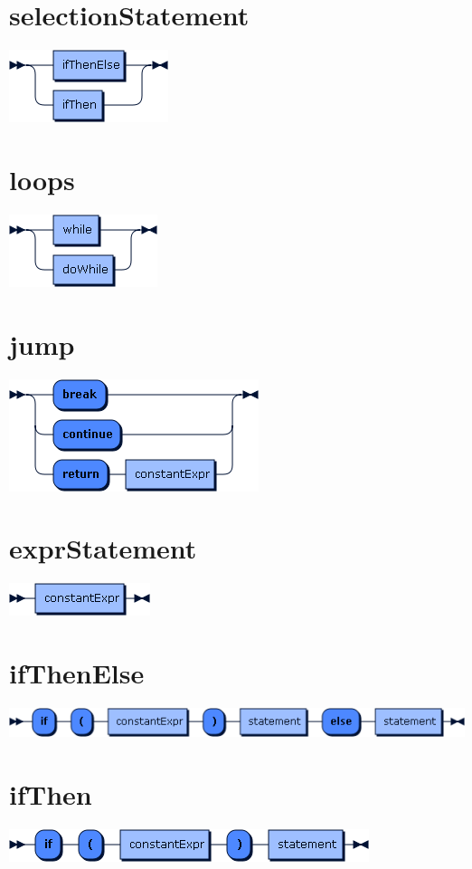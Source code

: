 \begin{appendices}
\section*{selectionStatement}\includegraphics[scale=0.7]{img/ebnf_grammar/selectionStatement}
\section*{loops}\includegraphics[scale=0.7]{img/ebnf_grammar/loops}
\section*{jump}\includegraphics[scale=0.7]{img/ebnf_grammar/jump}
\section*{exprStatement}\includegraphics[scale=0.7]{img/ebnf_grammar/exprStatement}

\section*{ifThenElse}\includegraphics[scale=0.7]{img/ebnf_grammar/ifThenElse}
\section*{ifThen}\includegraphics[scale=0.7]{img/ebnf_grammar/ifThen}

\end{appendices}
